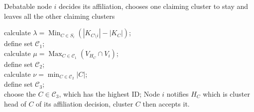 \documentclass[journal,comsoc]{IEEEtran}
\theoremstyle{mytheoremstyle}
\theoremstyle{mytheoremstyle}
\theoremstyle{mytheoremstyle}
\DeclareMathOperator*{\Max}{Max}
\DeclareMathOperator*{\Min}{Min}
\begin{document}
\section*{}
\begin{algorithm}               %
\caption{Debatable node $i$ decides its affiliation, chooses one claiming cluster to stay and leaves all the other claiming clusters}          %
\label{alg4}
\DontPrintSemicolon
\SetAlgoLined
{}
calculate $\lambda = \Min_{C\in S_i}(|K_{C\setminus i}|-|K_C|)$;\\
define set $\mathcal{C}_1$;\\	
{
calculate $\mu= \Max_{C\in \mathcal{C}_1}(V_{H_C}\cap V_i)$;\\
define set $\mathcal{C}_2$;\\	
	{
	calculate $\nu=\min_{C\in \mathcal{C}_2}|C|$;\\
	define set $\mathcal{C}_3$;\\	
		{choose the $C\in \mathcal{C}_3$, which has the highest ID;
		}
	}
}
Node $i$ notifies $H_C$ which is cluster head of $C$ of its affiliation decision, cluster $C$ then accepts it.

\end{algorithm}

\end{document}
